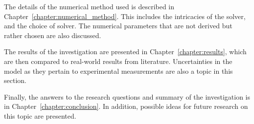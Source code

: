 The details of the numerical method used is described in Chapter~\ref{chapter:numerical_method}.
This includes the intricacies of the solver, and the choice of solver.
The numerical parameters that are not derived but rather chosen are also discussed.

The results of the investigation are presented in Chapter~\ref{chapter:results}, which are then compared to real-world results from literature.
Uncertainties in the model as they pertain to experimental measurements are also a topic in this section.

Finally, the answers to the research questions and summary of the investigation is in Chapter~\ref{chapter:conclusion}.
In addition, possible ideas for future research on this topic are presented.

